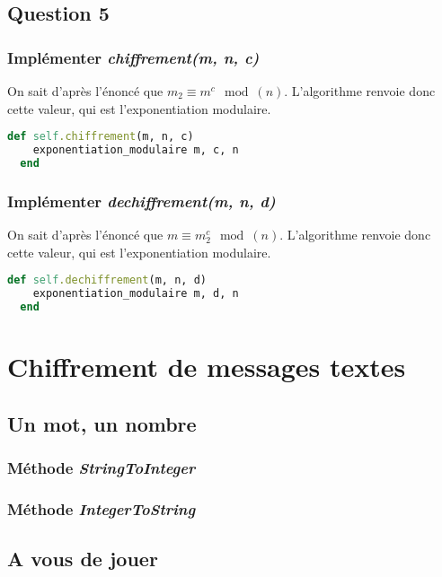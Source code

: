 \documentclass[a4paper,10pt]{article}
\begin{document}
\clearpage
\subsection{Question 5}
\subsubsection{Implémenter \textit{chiffrement(m, n, c)}}
On sait d'après l'énoncé que $m_2 \equiv m^c \mod(n)$. L'algorithme renvoie donc cette valeur, qui est l'exponentiation modulaire.\\
\begin{lstlisting}[language=Ruby]
  def self.chiffrement(m, n, c)
    exponentiation_modulaire m, c, n
  end
\end{lstlisting}

\subsubsection{Implémenter \textit{dechiffrement(m, n, d)}}
On sait d'après l'énoncé que $m \equiv m_2^c \mod(n)$. L'algorithme renvoie donc cette valeur, qui est l'exponentiation modulaire.\\
\begin{lstlisting}[language=Ruby]
  def self.dechiffrement(m, n, d)
    exponentiation_modulaire m, d, n
  end
\end{lstlisting}

\clearpage
\section{Chiffrement de messages textes}
\subsection{Un mot, un nombre}
\subsubsection{Méthode \textit{StringToInteger}}
\subsubsection{Méthode \textit{IntegerToString}}

\clearpage
\subsection{A vous de jouer}
\end{document}
